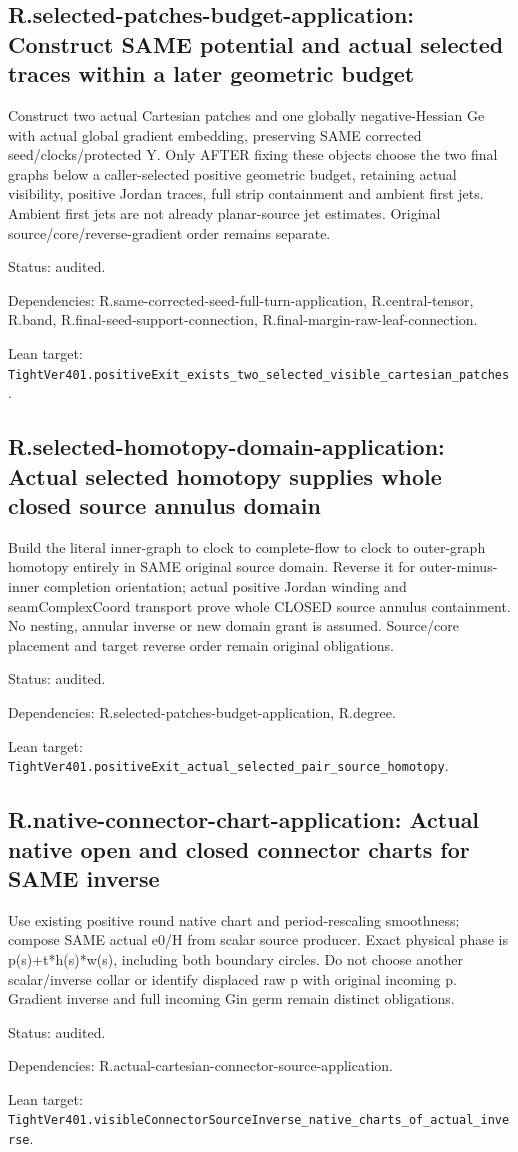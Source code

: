\documentclass{article}
\begin{document}
\subsection*{R.selected-patches-budget-application: Construct SAME potential and actual selected traces within a later geometric budget}
Construct two actual Cartesian patches and one globally negative-Hessian Ge with actual global gradient embedding, preserving SAME corrected seed/clocks/protected Y. Only AFTER fixing these objects choose the two final graphs below a caller-selected positive geometric budget, retaining actual visibility, positive Jordan traces, full strip containment and ambient first jets. Ambient first jets are not already planar-source jet estimates. Original source/core/reverse-gradient order remains separate.
\par Status: audited.
\par Dependencies: R.same-corrected-seed-full-turn-application, R.central-tensor, R.band, R.final-seed-support-connection, R.final-margin-raw-leaf-connection.
\par Lean target: \texttt{TightVer401.positiveExit\_exists\_two\_selected\_visible\_cartesian\_patches}.
\subsection*{R.selected-homotopy-domain-application: Actual selected homotopy supplies whole closed source annulus domain}
Build the literal inner-graph to clock to complete-flow to clock to outer-graph homotopy entirely in SAME original source domain. Reverse it for outer-minus-inner completion orientation; actual positive Jordan winding and seamComplexCoord transport prove whole CLOSED source annulus containment. No nesting, annular inverse or new domain grant is assumed. Source/core placement and target reverse order remain original obligations.
\par Status: audited.
\par Dependencies: R.selected-patches-budget-application, R.degree.
\par Lean target: \texttt{TightVer401.positiveExit\_actual\_selected\_pair\_source\_homotopy}.
\subsection*{R.native-connector-chart-application: Actual native open and closed connector charts for SAME inverse}
Use existing positive round native chart and period-rescaling smoothness; compose SAME actual e0/H from scalar source producer. Exact physical phase is p(s)+t*h(s)*w(s), including both boundary circles. Do not choose another scalar/inverse collar or identify displaced raw p with original incoming p. Gradient inverse and full incoming Gin germ remain distinct obligations.
\par Status: audited.
\par Dependencies: R.actual-cartesian-connector-source-application.
\par Lean target: \texttt{TightVer401.visibleConnectorSourceInverse\_native\_charts\_of\_actual\_inverse}.
\end{document}
